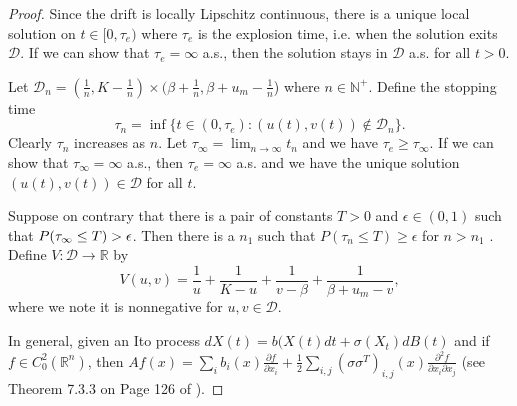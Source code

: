 \documentclass{aims}
\theoremstyle{definition}
\begin{document}
 \begin{proof}
 Since the drift is locally Lipschitz continuous, there is a unique
 local solution on $t\in[0,\tau_{e})$ where $\tau_{e}$ is the explosion
 time, i.e. when the solution exits $\mathcal{D}$. If we can show that $\tau_e=\infty$ a.s., then the solution stays in $\mathcal{D}$ a.s. for all $t>0$.  
 
 Let $\mathcal{D}_{n}=(\frac{1}{n},K-\frac{1}{n})\times(\beta+\frac{1}{n},\beta+u_{m}-\frac{1}{n}$)
 where $n\in\mathbb{N}^{+}$. Define the stopping time 
 \[
 \tau_{n}=\inf\{t\in(0,\tau_{e}):(u(t),v(t))\notin\mathcal{D}_{n}\}.
 \]
 Clearly $\tau_{n}$ increases as $n$. Let $\tau_{\infty}=\lim_{n\to\infty}t_{n}$
 and we have $\tau_{e}\ge\tau_{\infty}$. If we can show that $\tau_{\infty}=\infty$
 a.s., then $\tau_{e}=\infty$ a.s. and we have the unique solution
 $(u(t),v(t))\in\mathcal{D}$ for all $t$.
 
 Suppose on contrary that there is a pair of constants $T>0$ and $\epsilon\in(0,1)$ such that
  $P(\tau_{\infty}\le T)>\text{\ensuremath{\epsilon}}$. Then there
 is a $n_{1}$ such that  $P(\tau_{n}\le T)\ge\epsilon$ for $n>n_{1}$
 . Define $V:\mathcal{D}\to\mathbb{R}$ by
 \begin{equation}
 V(u,v)=\frac{1}{u}+\frac{1}{K-u}+\frac{1}{v-\beta}+\frac{1}{\beta+u_{m}-v},\label{eq:V(u,v)}
 \end{equation}
 where we note it is nonnegative for $u,v\in\mathcal{D}$. 
 
 In general, given an Ito process $dX(t)=b(X(t)dt+\sigma(X_t)dB(t)$ and if $f \in C_0^2(\mathbb{R}^n)$, then $Af(x) = \sum_i b_i(x) \frac{\partial f}{\partial x_i} + \frac{1}{2} \sum_{i,j} (\sigma \sigma^T)_{i,j}(x) \frac{\partial^2 f}{\partial x_i \partial x_j}$ (see Theorem 7.3.3 on Page 126 of \cite{OksendalSDEBook}).
 

\end{proof}
\end{document}
